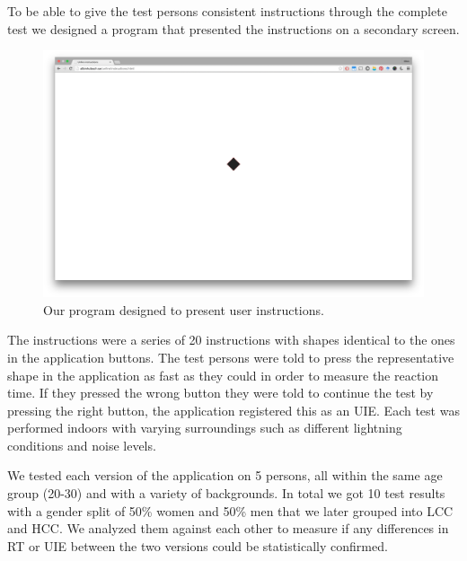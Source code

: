 \documentclass[runningheads,a4paper]{llncs}
\begin{document}
To be able to give the test persons consistent instructions through the complete test we designed a program that presented the instructions on a secondary screen. 
\begin{figure}
	\centering
	\includegraphics[width=\textwidth]{instructions}
	\caption{Our program designed to present user instructions.
	\label{fig:instructions}}
\end{figure}
The instructions were a series of 20 instructions with shapes identical to the ones in the application buttons. The test persons were told to press the representative shape in the application as fast as they could in order to measure the reaction time. If they pressed the wrong button they were told to continue the test by pressing the right button, the application registered this as an UIE. Each test was performed indoors with varying surroundings such as different lightning conditions and noise levels. 

We tested each version of the application on 5 persons, all within the same age group (20-30) and with a variety of backgrounds. In total we got 10 test results with a gender split of 50\% women and 50\% men that we later grouped into LCC and HCC. We analyzed them against each other to measure if any differences in RT or UIE between the two versions could be statistically confirmed.
\end{document}
